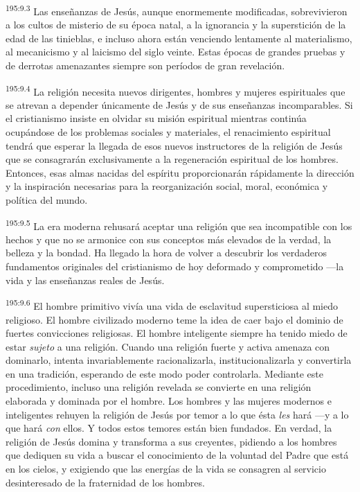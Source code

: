 \par 
\textsuperscript{195:9.3} Las enseñanzas de Jesús, aunque enormemente modificadas, sobrevivieron a los cultos de misterio de su época natal, a la ignorancia y la superstición de la edad de las tinieblas, e incluso ahora están venciendo lentamente al materialismo, al mecanicismo y al laicismo del siglo veinte. Estas épocas de grandes pruebas y de derrotas amenazantes siempre son períodos de gran revelación.

\par 
\textsuperscript{195:9.4} La religión necesita nuevos dirigentes, hombres y mujeres espirituales que se atrevan a depender únicamente de Jesús y de sus enseñanzas incomparables. Si el cristianismo insiste en olvidar su misión espiritual mientras continúa ocupándose de los problemas sociales y materiales, el renacimiento espiritual tendrá que esperar la llegada de esos nuevos instructores de la religión de Jesús que se consagrarán exclusivamente a la regeneración espiritual de los hombres. Entonces, esas almas nacidas del espíritu proporcionarán rápidamente la dirección y la inspiración necesarias para la reorganización social, moral, económica y política del mundo.

\par 
\textsuperscript{195:9.5} La era moderna rehusará aceptar una religión que sea incompatible con los hechos y que no se armonice con sus conceptos más elevados de la verdad, la belleza y la bondad. Ha llegado la hora de volver a descubrir los verdaderos fundamentos originales del cristianismo de hoy deformado y comprometido ---la vida y las enseñanzas reales de Jesús.

\par 
\textsuperscript{195:9.6} El hombre primitivo vivía una vida de esclavitud supersticiosa al miedo religioso. El hombre civilizado moderno teme la idea de caer bajo el dominio de fuertes convicciones religiosas. El hombre inteligente siempre ha tenido miedo de estar \textit{sujeto} a una religión. Cuando una religión fuerte y activa amenaza con dominarlo, intenta invariablemente racionalizarla, institucionalizarla y convertirla en una tradición, esperando de este modo poder controlarla. Mediante este procedimiento, incluso una religión revelada se convierte en una religión elaborada y dominada por el hombre. Los hombres y las mujeres modernos e inteligentes rehuyen la religión de Jesús por temor a lo que ésta \textit{les} hará ---y a lo que hará \textit{con} ellos. Y todos estos temores están bien fundados. En verdad, la religión de Jesús domina y transforma a sus creyentes, pidiendo a los hombres que dediquen su vida a buscar el conocimiento de la voluntad del Padre que está en los cielos, y exigiendo que las energías de la vida se consagren al servicio desinteresado de la fraternidad de los hombres.

